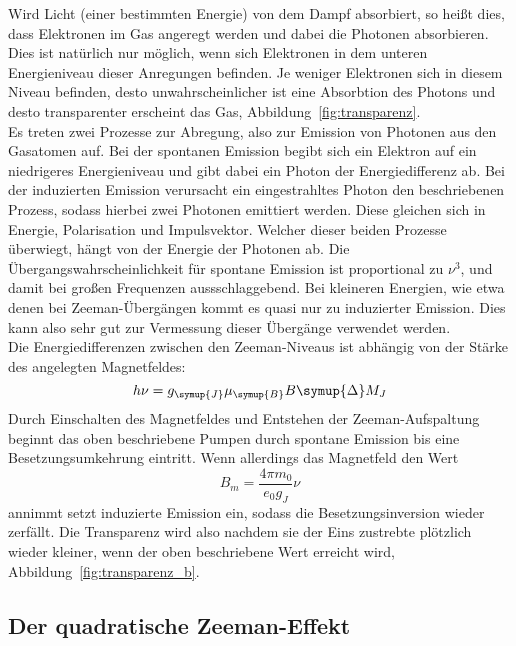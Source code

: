 Wird Licht (einer bestimmten Energie) von dem Dampf absorbiert, so heißt dies,
dass Elektronen im Gas angeregt werden und dabei die Photonen absorbieren. Dies
ist natürlich nur möglich, wenn sich Elektronen in dem unteren Energieniveau
dieser Anregungen befinden. Je weniger Elektronen sich in diesem Niveau
befinden, desto unwahrscheinlicher ist eine Absorbtion des Photons und desto
transparenter erscheint das Gas, Abbildung~\ref{fig:transparenz}. \\
Es treten zwei Prozesse zur Abregung, also zur Emission von Photonen aus den
Gasatomen auf. Bei der spontanen Emission begibt sich ein Elektron auf
ein niedrigeres Energieniveau und gibt dabei ein Photon der Energiedifferenz
ab. Bei der induzierten Emission verursacht ein eingestrahltes Photon
den beschriebenen Prozess, sodass hierbei zwei Photonen emittiert werden. Diese
gleichen sich in Energie, Polarisation und Impulsvektor. Welcher dieser beiden
Prozesse überwiegt, hängt von der Energie der Photonen ab. Die
Übergangswahrscheinlichkeit für spontane Emission ist proportional zu $\nu^3$,
und damit bei großen Frequenzen aussschlaggebend. Bei kleineren Energien, wie
etwa denen bei Zeeman-Übergängen kommt es quasi nur zu induzierter Emission.
Dies kann also sehr gut zur Vermessung dieser Übergänge verwendet werden. \\
Die Energiedifferenzen zwischen den Zeeman-Niveaus ist abhängig von der Stärke
des angelegten Magnetfeldes:
%
\begin{equation}
  h\nu=g_{\symup{J}}\mu_{\symup{B}}B\symup{\Delta}M_J
  \label{eq:übergangsenergie}
\end{equation}
%
Durch Einschalten des Magnetfeldes und Entstehen der Zeeman-Aufspaltung beginnt
das oben beschriebene Pumpen durch spontane Emission bis eine
Besetzungsumkehrung eintritt. Wenn allerdings das Magnetfeld den Wert
%
\begin{equation}
  B_m=\frac{4\pi m_0}{e_0g_J}\nu
\end{equation}
%
annimmt setzt induzierte Emission ein, sodass die Besetzungsinversion wieder
zerfällt. Die Transparenz wird also nachdem sie der Eins zustrebte plötzlich
wieder kleiner, wenn der oben beschriebene Wert erreicht wird, Abbildung~\ref{fig:transparenz_b}.
%
%


\subsection{Der quadratische Zeeman-Effekt}

